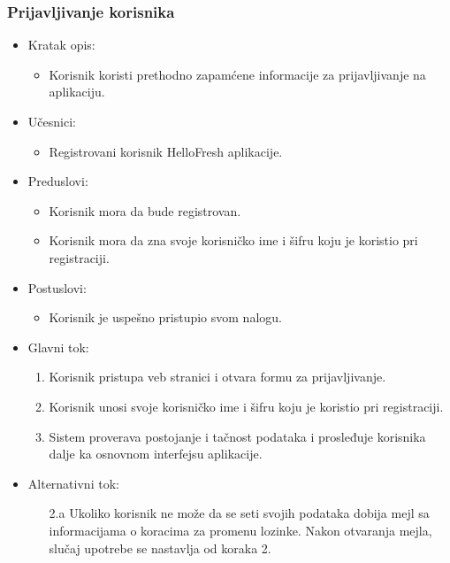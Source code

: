 \subsubsection{Prijavljivanje korisnika}

\begin{itemize}
    \item Kratak opis:
        \begin{itemize}
            \item Korisnik koristi prethodno zapamćene informacije za prijavljivanje na aplikaciju.
        \end{itemize}
    \item Učesnici:
        \begin{itemize}
            \item Registrovani korisnik HelloFresh aplikacije.
        \end{itemize}
    \item Preduslovi:
        \begin{itemize}
            \item Korisnik mora da bude registrovan.
            \item Korisnik mora da zna svoje korisničko ime i šifru koju je koristio pri registraciji.
        \end{itemize}
    \item Postuslovi:
        \begin{itemize}
            \item Korisnik je uspešno pristupio svom nalogu.
        \end{itemize}
    \item Glavni tok:
        \begin{enumerate}
            \item Korisnik pristupa veb stranici i otvara formu za prijavljivanje.
            \item Korisnik unosi svoje korisničko ime i šifru koju je koristio pri registraciji.
            \item Sistem proverava postojanje i tačnost podataka i prosleđuje korisnika dalje ka osnovnom interfejsu aplikacije.
        \end{enumerate}
    \item Alternativni tok:
        \begin{itemize}
            \item[2.a] Ukoliko korisnik ne može da se seti svojih podataka dobija mejl sa informacijama o koracima za promenu lozinke. Nakon otvaranja mejla, slučaj upotrebe se nastavlja od koraka 2.

\end{itemize}
\end{itemize}

